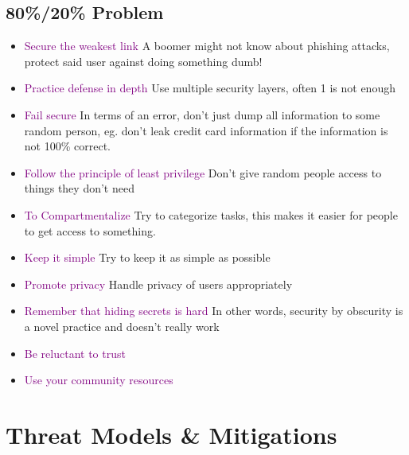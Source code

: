 \documentclass[main.tex,fontsize=8pt,paper=a4,paper=portrait,DIV=calc,]{scrartcl}
\begin{document}
\subsection{80\%/20\% Problem}
\begin{itemize}
\item \textcolor{purple}{Secure the weakest link}\newline
  A boomer might not know about phishing attacks, protect said user against doing something dumb!
\item \textcolor{purple}{Practice defense in depth}\newline
  Use multiple security layers, often 1 is not enough
\item \textcolor{purple}{Fail secure}\newline
  In terms of an error, don't just dump all information to some random person, eg. don't leak credit card information if the information is not 100\% correct.
\item \textcolor{purple}{Follow the principle of least privilege}\newline
  Don't give random people access to things they don't need
\item \textcolor{purple}{To Compartmentalize}\newline
  Try to categorize tasks, this makes it easier for people to get access to something.
\item \textcolor{purple}{Keep it simple}\newline
  Try to keep it as simple as possible
\item \textcolor{purple}{Promote privacy}\newline
  Handle privacy of users appropriately
\item \textcolor{purple}{Remember that hiding secrets is hard}
  In other words, security by obscurity is a novel practice and doesn't really work
\item \textcolor{purple}{Be reluctant to trust}
\item \textcolor{purple}{Use your community resources}
\end{itemize}

\section{Threat Models \& Mitigations}
\end{document}
